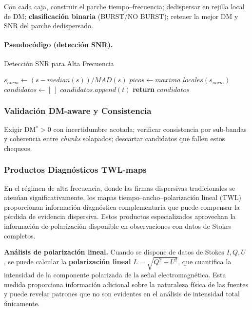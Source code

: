 Con cada caja, construir el parche tiempo--frecuencia; dedispersar en rejilla local de DM; \textbf{clasificación binaria} (BURST/NO BURST); retener la mejor DM y SNR del parche dedispersado.

\paragraph{Pseudocódigo (detección SNR).}
\begin{algorithm}[h]
\caption{Detección SNR para Alta Frecuencia}
\begin{algorithmic}[1]
    \State $s_{norm} \leftarrow (s - median(s)) / MAD(s)$
    \State $picos \leftarrow maxima\_locales(s_{norm})$
    \State $candidatos \leftarrow [\ ]$
            \State $candidatos.append(t)$
        \EndIf
    \EndFor
    \State \textbf{return} $candidatos$
\EndFunction
\end{algorithmic}
\end{algorithm}

\subsubsection{Validación DM-aware y Consistencia}

Exigir DM$^\ast\!>\!0$ con incertidumbre acotada; verificar consistencia por sub-bandas y coherencia entre \emph{chunks} solapados; descartar candidatos que fallen estos chequeos.

\subsubsection{Productos Diagnósticos TWL-maps}

En el régimen de alta frecuencia, donde las firmas dispersivas tradicionales se atenúan significativamente, los mapas tiempo--ancho--polarización lineal (TWL) proporcionan información diagnóstica complementaria que puede compensar la pérdida de evidencia dispersiva. Estos productos especializados aprovechan la información de polarización disponible en observaciones con datos de Stokes completos.

\noindent\textbf{Análisis de polarización lineal.} Cuando se dispone de datos de Stokes $I,Q,U$ \cite{hamaker1996understanding}, se puede calcular la \textbf{polarización lineal} $L=\sqrt{Q^2+U^2}$, que cuantifica la intensidad de la componente polarizada de la señal electromagnética. Esta medida proporciona información adicional sobre la naturaleza física de las fuentes y puede revelar patrones que no son evidentes en el análisis de intensidad total únicamente.

